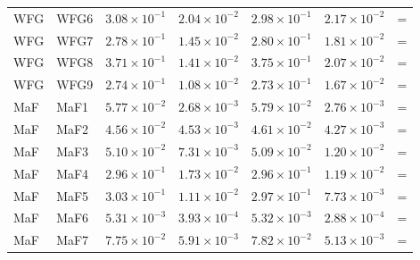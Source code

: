\begin{table}[t]
\begin{tabular}{llrrrrl}
WFG & WFG6 & $3.08\!\times\!10^{-1}$ & $2.04\!\times\!10^{-2}$ & $2.98\!\times\!10^{-1}$ & $2.17\!\times\!10^{-2}$ & = \\
WFG & WFG7 & $2.78\!\times\!10^{-1}$ & $1.45\!\times\!10^{-2}$ & $2.80\!\times\!10^{-1}$ & $1.81\!\times\!10^{-2}$ & = \\
WFG & WFG8 & $3.71\!\times\!10^{-1}$ & $1.41\!\times\!10^{-2}$ & $3.75\!\times\!10^{-1}$ & $2.07\!\times\!10^{-2}$ & = \\
WFG & WFG9 & $2.74\!\times\!10^{-1}$ & $1.08\!\times\!10^{-2}$ & $2.73\!\times\!10^{-1}$ & $1.67\!\times\!10^{-2}$ & = \\
\addlinespace
MaF & MaF1 & $5.77\!\times\!10^{-2}$ & $2.68\!\times\!10^{-3}$ & $5.79\!\times\!10^{-2}$ & $2.76\!\times\!10^{-3}$ & = \\
MaF & MaF2 & $4.56\!\times\!10^{-2}$ & $4.53\!\times\!10^{-3}$ & $4.61\!\times\!10^{-2}$ & $4.27\!\times\!10^{-3}$ & = \\
MaF & MaF3 & $5.10\!\times\!10^{-2}$ & $7.31\!\times\!10^{-3}$ & $5.09\!\times\!10^{-2}$ & $1.20\!\times\!10^{-2}$ & = \\
MaF & MaF4 & $2.96\!\times\!10^{-1}$ & $1.73\!\times\!10^{-2}$ & $2.96\!\times\!10^{-1}$ & $1.19\!\times\!10^{-2}$ & = \\
MaF & MaF5 & $3.03\!\times\!10^{-1}$ & $1.11\!\times\!10^{-2}$ & $2.97\!\times\!10^{-1}$ & $7.73\!\times\!10^{-3}$ & = \\
MaF & MaF6 & $5.31\!\times\!10^{-3}$ & $3.93\!\times\!10^{-4}$ & $5.32\!\times\!10^{-3}$ & $2.88\!\times\!10^{-4}$ & = \\
MaF & MaF7 & $7.75\!\times\!10^{-2}$ & $5.91\!\times\!10^{-3}$ & $7.82\!\times\!10^{-2}$ & $5.13\!\times\!10^{-3}$ & = \\
\bottomrule
\end{tabular}
\end{table}
